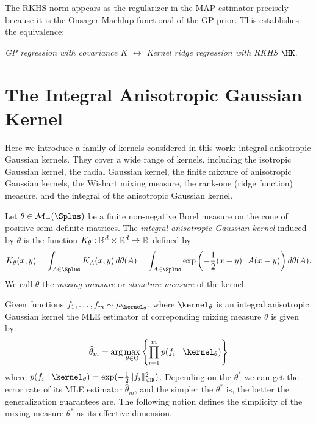 \documentclass{article}
\newcommand{\nfunctions}{{m}}
\begin{document}
\begin{remark}
	The RKHS norm appears as the regularizer in the MAP estimator precisely because it is the Onsager-Machlup functional of the GP prior. This establishes the equivalence:
	\begin{center}
		\emph{GP regression with covariance $K$} $\longleftrightarrow$ \emph{Kernel ridge regression with RKHS $\HK$}.
	\end{center}
\end{remark}



\section{The Integral Anisotropic Gaussian Kernel}\label{sec:integral-anisotropic-gaussian-kernel}

Here we introduce a family of kernels considered in this work: integral anisotropic Gaussian kernels. They cover a wide range of kernels, including the isotropic Gaussian kernel, the radial Gaussian kernel, the finite mixture of anisotropic Gaussian kernels, the Wishart mixing measure, the rank-one (ridge function) measure, and the integral of the anisotropic Gaussian kernel.

\begin{definition}
	\label{def:integral-kernel}
	Let $\theta \in \mathcal{M}_+(\Splus)$ be a finite non-negative Borel measure on the cone of positive semi-definite matrices. The \emph{integral anisotropic Gaussian kernel} induced by $\theta$ is the function $K_\theta: \mathbb{R}^d \times \mathbb{R}^d \to \mathbb{R}$ defined by
	\begin{equation}
		K_\theta(x, y) = \int_{A \in \Splus} K_A(x, y) \, d\theta(A) = \int_{A \in \Splus} \exp\left( -\frac{1}{2}(x-y)^\top A (x-y) \right) d\theta(A).
	\end{equation}
	We call $\theta$ the \emph{mixing measure} or \emph{structure measure} of the kernel.
\end{definition}



Given functions $f_1, \ldots, f_{\nfunctions} \sim \mu_{\kernel_\theta}$, where $\kernel_\theta$ is an integral anisotropic Gaussian kernel the MLE estimator of correponding mixing measure $\theta$ is given by:
\begin{equation}\label{eq:mle-estimator}
	\hat{\theta}_m = \arg\max_{\theta \in \Theta} \left\{ \prod_{i=1}^{\nfunctions} p(f_i \mid \kernel_\theta) \right\}
\end{equation}
where $p(f_i \mid \kernel_\theta) = \exp(-\frac{1}{2}\|f_i\|_{\HK}^2)$. Depending on the $\theta^*$ we can get the error rate of its MLE estimator $\hat{\theta}_m$, and the simpler the $\theta^*$ is, the better the generalization guarantees are. The following notion defines the simplicity of the mixing measure $\theta^*$ as its effective dimension.
\end{document}
